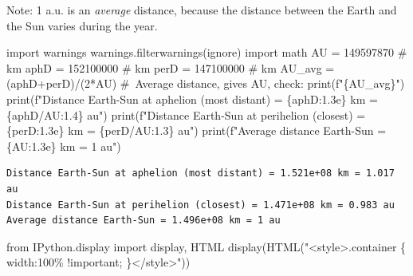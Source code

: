 \documentclass[
  letterpaper,
  DIV=11,
  numbers=noendperiod]{scrartcl}
\newenvironment{Shaded}{\begin{snugshade}}{\end{snugshade}}
\newcommand{\BuiltInTok}[1]{\textcolor[rgb]{0.00,0.23,0.31}{#1}}
\newcommand{\CommentTok}[1]{\textcolor[rgb]{0.37,0.37,0.37}{#1}}
\newcommand{\DecValTok}[1]{\textcolor[rgb]{0.68,0.00,0.00}{#1}}
\newcommand{\ImportTok}[1]{\textcolor[rgb]{0.00,0.46,0.62}{#1}}
\newcommand{\NormalTok}[1]{\textcolor[rgb]{0.00,0.23,0.31}{#1}}
\newcommand{\OperatorTok}[1]{\textcolor[rgb]{0.37,0.37,0.37}{#1}}
\newcommand{\SpecialCharTok}[1]{\textcolor[rgb]{0.37,0.37,0.37}{#1}}
\newcommand{\SpecialStringTok}[1]{\textcolor[rgb]{0.13,0.47,0.30}{#1}}
\newcommand{\StringTok}[1]{\textcolor[rgb]{0.13,0.47,0.30}{#1}}
\begin{document}
Note: 1 a.u. is an \emph{average} distance, because the distance between
the Earth and the Sun varies during the year.

\begin{Shaded}
\begin{Highlighting}[]
\ImportTok{import}\NormalTok{ warnings}
\NormalTok{warnings.filterwarnings(}\StringTok{\textquotesingle{}ignore\textquotesingle{}}\NormalTok{)}
\ImportTok{import}\NormalTok{ math}
\NormalTok{AU }\OperatorTok{=} \DecValTok{149597870} \CommentTok{\# km}
\NormalTok{aphD }\OperatorTok{=} \DecValTok{152100000} \CommentTok{\# km}
\NormalTok{perD }\OperatorTok{=} \DecValTok{147100000} \CommentTok{\# km}
\NormalTok{AU\_avg }\OperatorTok{=}\NormalTok{ (aphD}\OperatorTok{+}\NormalTok{perD)}\OperatorTok{/}\NormalTok{(}\DecValTok{2}\OperatorTok{*}\NormalTok{AU) }\CommentTok{\# Average distance, gives AU, check: print(f"\{AU\_avg\}")}
\BuiltInTok{print}\NormalTok{(}\SpecialStringTok{f"Distance Earth{-}Sun at aphelion (most distant) = }\SpecialCharTok{\{}\NormalTok{aphD}\SpecialCharTok{:1.3e\}}\SpecialStringTok{ km = }\SpecialCharTok{\{}\NormalTok{aphD}\OperatorTok{/}\NormalTok{AU}\SpecialCharTok{:1.4\}}\SpecialStringTok{ au"}\NormalTok{)}
\BuiltInTok{print}\NormalTok{(}\SpecialStringTok{f"Distance Earth{-}Sun at perihelion (closest) = }\SpecialCharTok{\{}\NormalTok{perD}\SpecialCharTok{:1.3e\}}\SpecialStringTok{ km = }\SpecialCharTok{\{}\NormalTok{perD}\OperatorTok{/}\NormalTok{AU}\SpecialCharTok{:1.3\}}\SpecialStringTok{ au"}\NormalTok{)}
\BuiltInTok{print}\NormalTok{(}\SpecialStringTok{f"Average distance Earth{-}Sun = }\SpecialCharTok{\{}\NormalTok{AU}\SpecialCharTok{:1.3e\}}\SpecialStringTok{ km = 1 au"}\NormalTok{)}
\end{Highlighting}
\end{Shaded}

\begin{verbatim}
Distance Earth-Sun at aphelion (most distant) = 1.521e+08 km = 1.017 au
Distance Earth-Sun at perihelion (closest) = 1.471e+08 km = 0.983 au
Average distance Earth-Sun = 1.496e+08 km = 1 au
\end{verbatim}

\begin{Shaded}
\begin{Highlighting}[]
\ImportTok{from}\NormalTok{ IPython.display }\ImportTok{import}\NormalTok{ display, HTML}
\NormalTok{display(HTML(}\StringTok{"\textless{}style\textgreater{}.container \{ width:100\% !important; \}\textless{}/style\textgreater{}"}\NormalTok{))}
\end{Highlighting}
\end{Shaded}
\end{document}
